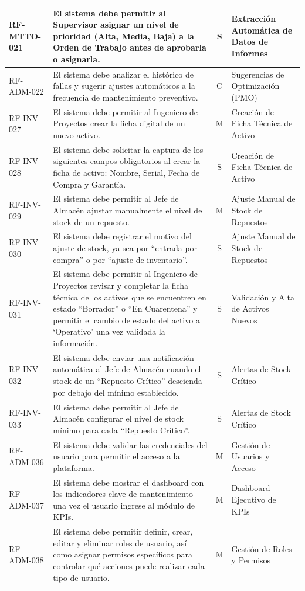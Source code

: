 \begin{longtable}{|p{2.2cm}|p{8.5cm}|c|p{3.5cm}|}
RF-MTTO-021 & El sistema debe permitir al Supervisor asignar un nivel de prioridad (Alta, Media, Baja) a la Orden de Trabajo antes de aprobarla o asignarla. & S & Extracción Automática de Datos de Informes \\ \hline
RF-ADM-022 & El sistema debe analizar el histórico de fallas y sugerir ajustes automáticos a la frecuencia de mantenimiento preventivo. & C & Sugerencias de Optimización (PMO) \\ \hline
RF-INV-027 & El sistema debe permitir al Ingeniero de Proyectos crear la ficha digital de un nuevo activo. & M & Creación de Ficha Técnica de Activo \\ \hline
RF-INV-028 & El sistema debe solicitar la captura de los siguientes campos obligatorios al crear la ficha de activo: Nombre, Serial, Fecha de Compra y Garantía. & S & Creación de Ficha Técnica de Activo \\ \hline
RF-INV-029 & El sistema debe permitir al Jefe de Almacén ajustar manualmente el nivel de stock de un repuesto. & M & Ajuste Manual de Stock de Repuestos \\ \hline
RF-INV-030 & El sistema debe registrar el motivo del ajuste de stock, ya sea por ``entrada por compra'' o por ``ajuste de inventario''. & S & Ajuste Manual de Stock de Repuestos \\ \hline
RF-INV-031 & El sistema debe permitir al Ingeniero de Proyectos revisar y completar la ficha técnica de los activos que se encuentren en estado ``Borrador'' o ``En Cuarentena'' y permitir el cambio de estado del activo a `Operativo' una vez validada la información. & S & Validación y Alta de Activos Nuevos \\ \hline
RF-INV-032 & El sistema debe enviar una notificación automática al Jefe de Almacén cuando el stock de un ``Repuesto Crítico'' descienda por debajo del mínimo establecido. & S & Alertas de Stock Crítico \\ \hline
RF-INV-033 & El sistema debe permitir al Jefe de Almacén configurar el nivel de stock mínimo para cada ``Repuesto Crítico''. & S & Alertas de Stock Crítico \\ \hline
RF-ADM-036 & El sistema debe validar las credenciales del usuario para permitir el acceso a la plataforma. & M & Gestión de Usuarios y Acceso \\ \hline
RF-ADM-037 & El sistema debe mostrar el dashboard con los indicadores clave de mantenimiento una vez el usuario ingrese al módulo de KPIs. & M & Dashboard Ejecutivo de KPIs \\ \hline
RF-ADM-038 & El sistema debe permitir definir, crear, editar y eliminar roles de usuario, así como asignar permisos específicos para controlar qué acciones puede realizar cada tipo de usuario. & M & Gestión de Roles y Permisos \\ \hline

\end{longtable}
